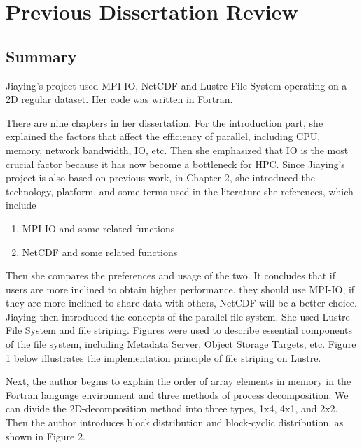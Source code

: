 \documentclass{article}
\begin{document}
\section{Previous Dissertation Review}
\subsection{Summary}
Jiaying’s project used MPI-IO, NetCDF and Lustre File System operating on a 2D regular dataset. Her code was written in Fortran.

There are nine chapters in her dissertation. For the introduction part, she explained the factors that affect the efficiency of parallel, including CPU, memory, network bandwidth, IO, etc. Then she emphasized that IO is the most crucial factor because it has now become a bottleneck for HPC. Since Jiaying’s project is also based on previous work, in Chapter 2, she introduced the technology, platform, and some terms used in the literature she references, which include

\begin{enumerate}
	\item {MPI-IO and some related functions}
	\item {NetCDF and some related functions}
\end{enumerate}

Then she compares the preferences and usage of the two. It concludes that if users are more inclined to obtain higher performance, they should use MPI-IO, if they are more inclined to share data with others, NetCDF will be a better choice.
Jiaying then introduced the concepts of the parallel file system. She used Lustre File System and file striping. Figures were used to describe essential components of the file system, including Metadata Server, Object Storage Targets, etc.
Figure 1 below illustrates the implementation principle of file striping on Lustre.

Next, the author begins to explain the order of array elements in memory in the Fortran language environment and three methods of process decomposition.
We can divide the 2D-decomposition method into three types, 1x4, 4x1, and 2x2. Then the author introduces block distribution and block-cyclic distribution, as shown in Figure 2.
\end{document}
